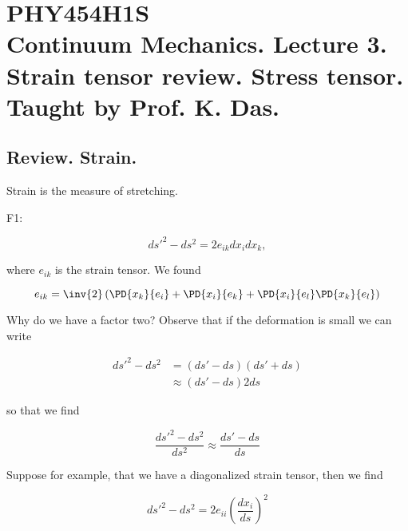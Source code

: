 
%

\chapter{PHY454H1S\\Continuum Mechanics.  Lecture 3.  Strain tensor review.  Stress tensor.  Taught by Prof. K. Das.}
\label{chap:continuumL3}
{}
\date{Jan 18, 2012}

\beginArtWithToc

\section{Review.  Strain.}

Strain is the measure of stretching.

F1: %

\begin{equation}\label{eqn:continuumL3:10}
{ds'}^2 - ds^2 = 2 e_{ik} dx_i dx_k,
\end{equation}

where $e_{ik}$ is the strain tensor.  We found

\begin{equation}\label{eqn:continuumL3:30}
e_{ik} = \inv{2} \left( 
\PD{x_k}{e_i} 
+\PD{x_i}{e_k} 
+
\PD{x_i}{e_l} 
\PD{x_k}{e_l} 
\right)
\end{equation}

Why do we have a factor two?  Observe that if the deformation is small we can write

\begin{align*}
{ds'}^2 - ds^2 
&= (ds' - ds)(ds' + ds) \\
&\approx
 (ds' - ds) 2 ds
\end{align*}

so that we find 

\begin{equation}\label{eqn:continuumL3:50}
\frac{{ds'}^2 - ds^2 }{ds^2}
\approx
\frac{ds' - ds }{ds}
\end{equation}

Suppose for example, that we have a diagonalized strain tensor, then we find

\begin{equation}\label{eqn:continuumL3:70}
{ds'}^2 - ds^2 
= 2 e_{ii} \left(\frac{dx_i}{ds}\right)^2
\end{equation}

